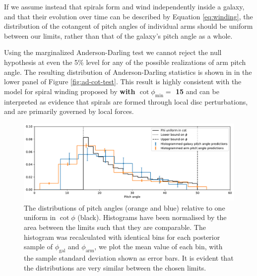 If we assume instead that spirals form and wind independently inside a galaxy, and that their evolution over time can be described by Equation \ref{eq:winding}, the distribution of the cotangent of pitch angles of individual arms should be uniform between our limits, rather than that of the galaxy's pitch angle as a whole.

Using the marginalized Anderson-Darling test we cannot reject the null hypothesis at even the 5\% level for any of the possible realizations of arm pitch angle. The resulting distribution of Anderson-Darling statistics is shown in in the lower panel of Figure \ref{fig:ad-cot-test}. This result is highly consistent with the model for spiral winding proposed by \citet{2019arXiv190910291P} {\bf with $\cot{\phi_\mathrm{min}} = $ {15\degree} } and can be interpreted as evidence that spirals are formed through local disc perturbations, and are primarily governed by local forces.

\begin{figure}
  \includegraphics[width=17.7cm]{plots/phi_distribution_comparison.pdf}
  \caption{The distributions of pitch angles (orange and blue) relative to one uniform in $\cot\phi$ (black). Histograms have been normalised by the area between the limits such that they are comparable. The histogram was recalculated with identical bins for each posterior sample of $\phi_\mathrm{gal}$ and $\phi_\mathrm{arm}$, we plot the mean value of each bin, with the sample standard deviation shown as error bars. It is evident that the distributions are very similar between the chosen limits.}
  \label{fig:pa-cot-distributions}
\end{figure}


